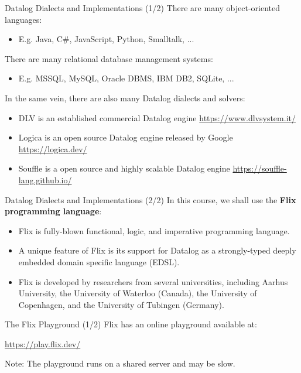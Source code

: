\begin{frame}{Datalog Dialects and Implementations (1/2)}
There are many object-oriented languages:
\begin{itemize}
    \item E.g. Java, C\#, JavaScript, Python, Smalltalk, ...
\end{itemize}

\pause

There are many relational database management systems:
\begin{itemize}
    \item E.g. MSSQL, MySQL, Oracle DBMS, IBM DB2, SQLite, ...
\end{itemize}

\pause

In the same vein, there are also many Datalog dialects and solvers:

\begin{itemize}
    \item DLV is an established commercial Datalog engine {\small
    \url{https://www.dlvsystem.it/}}
    \item Logica is an open source Datalog engine released by Google
    \small
    \url{https://logica.dev/}
    \item Souffle is a open source and highly scalable Datalog engine {\small
    \url{https://souffle-lang.github.io/}}
\end{itemize}
\end{frame}

\begin{frame}{Datalog Dialects and Implementations (2/2)}
In this course, we shall use the \textbf{Flix programming language}:
\begin{itemize}
    \item Flix is fully-blown functional, logic, and imperative programming
    language. 
    \item A unique feature of Flix is its support for Datalog as a
    strongly-typed deeply embedded domain specific language (EDSL).
    \item Flix is developed by researchers from several universities, including
    Aarhus University, the University of Waterloo (Canada), the University of
    Copenhagen, and the University of Tubingen (Germany).
\end{itemize}  
\end{frame}

\begin{frame}{The Flix Playground (1/2)}
Flix has an online playground available at:

\bigskip
\bigskip

\begin{center}
\LARGE
\url{https://play.flix.dev/}
\end{center}

\bigskip
\bigskip

Note: The playground runs on a shared server and may be slow.

\end{frame}

